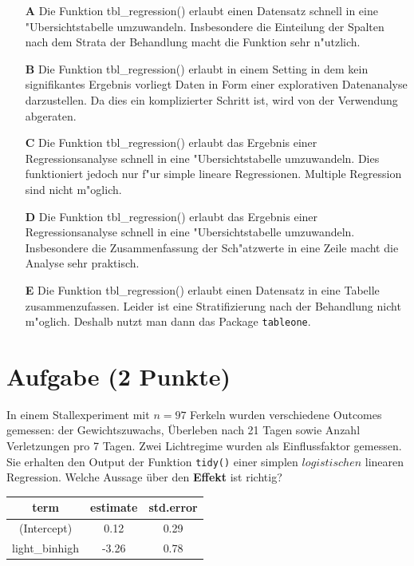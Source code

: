 \documentclass[a4paper, 10pt]{scrartcl}\usepackage[]{graphicx}\usepackage[]{xcolor}
\begin{document}
\begin{enumerate}
\item [\textbf{A} \msquare] Die Funktion tbl\_regression() erlaubt einen Datensatz schnell in eine {"U}bersichtstabelle umzuwandeln. Insbesondere die Einteilung der Spalten nach dem Strata der Behandlung macht die Funktion sehr n{"u}tzlich.
\item [\textbf{B} \msquare] Die Funktion tbl\_regression() erlaubt in einem Setting in dem kein signifikantes Ergebnis vorliegt Daten in Form einer explorativen Datenanalyse darzustellen. Da dies ein komplizierter Schritt ist, wird von der Verwendung abgeraten.
\item [\textbf{C} \msquare] Die Funktion tbl\_regression() erlaubt das Ergebnis einer Regressionsanalyse schnell in eine {"U}bersichtstabelle umzuwandeln. Dies funktioniert jedoch nur f{"u}r simple lineare Regressionen. Multiple Regression sind nicht m{"o}glich.
\item [\textbf{D} \msquare] Die Funktion tbl\_regression() erlaubt das Ergebnis einer Regressionsanalyse schnell in eine {"U}bersichtstabelle umzuwandeln. Insbesondere die Zusammenfassung der Sch{"a}tzwerte in eine Zeile macht die Analyse sehr praktisch.
\item [\textbf{E} \msquare] Die Funktion tbl\_regression() erlaubt einen Datensatz in eine Tabelle zusammenzufassen. Leider ist eine Stratifizierung nach der Behandlung nicht m{"o}glich. Deshalb nutzt man dann das \Rlogo Package \texttt{tableone}.
\end{enumerate}

\section{Aufgabe \hfill (2 Punkte)}



In einem Stallexperiment mit $n = 97$ Ferkeln wurden verschiedene
Outcomes gemessen: der Gewichtszuwachs, {\"U}berleben nach 21 Tagen sowie
Anzahl Verletzungen pro 7 Tagen. Zwei Lichtregime wurden als
Einflussfaktor gemessen. Sie erhalten den \Rlogo Output der Funktion
\texttt{tidy()} einer simplen $logistischen$ linearen
Regression. Welche Aussage {\"u}ber den \textbf{Effekt} ist richtig?

\begin{table}[!h]
\centering
\begin{tabular}{ccc}
\toprule
term & estimate & std.error\\
\midrule
(Intercept) & 0.12 & 0.29\\
light\_binhigh & -3.26 & 0.78\\
\bottomrule
\end{tabular}
\end{table}
\end{document}
